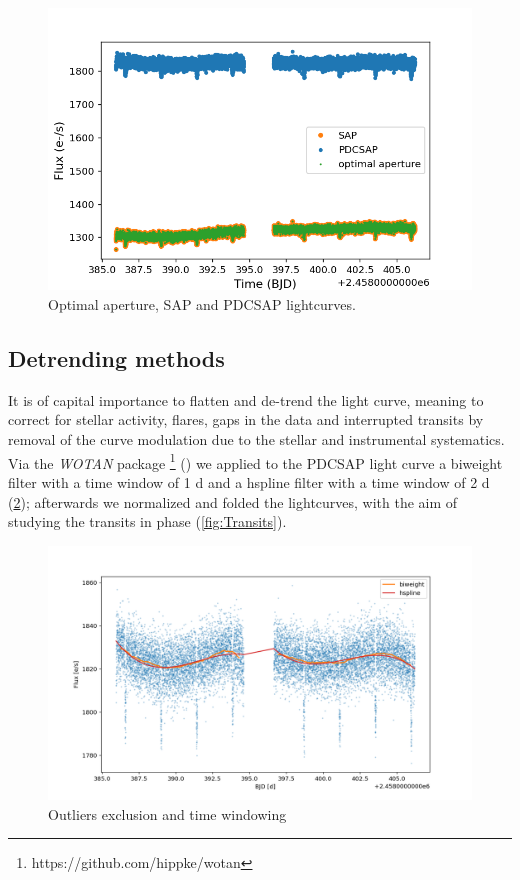 \documentclass[a4paper,11pt,twocolumn]{article}
\begin{document}
\begin{figure}
    \centering
    \includegraphics[scale=0.3, angle=0]{../pictures/tess/lightcurve.png}
    \caption{Optimal aperture, SAP and PDCSAP lightcurves.}
    \label{fig:tess_lc}
\end{figure}



\subsection{Detrending methods}

It is of capital importance to flatten and de-trend the light curve, meaning to correct for stellar activity, 
flares, gaps in the data and interrupted transits by removal of the curve modulation due to the stellar and instrumental systematics.
Via the \textit{WOTAN} package \footnote{https://github.com/hippke/wotan} (\cite{Hippke1}) we applied to the 
PDCSAP light curve a biweight filter with a time window of 1 d and a hspline filter with a time window of 2 d 
(\ref{fig:filters}); afterwards we normalized and folded the lightcurves, with the aim of studying the transits in phase (\ref{fig:Transits}).


\begin{figure}
    \includegraphics[scale=0.18, angle=0]{../pictures/tess/filters.png}
    \caption{Outliers exclusion and time windowing}
   \label{fig:filters}
\end{figure}
\end{document}
